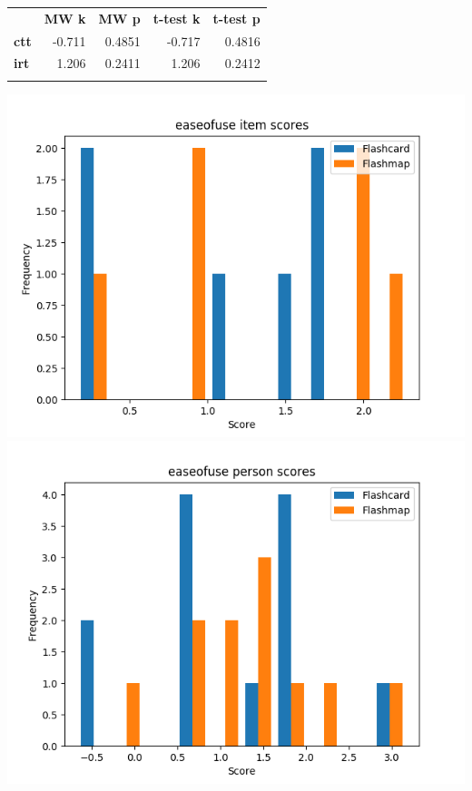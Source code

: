 \begin{longtable}[c]{@{}lrrrr@{}}
\toprule\addlinespace
& \textbf{MW k} & \textbf{MW p} &
\textbf{t-test k} & \textbf{t-test p}
\\\addlinespace
\midrule
\textbf{ctt} & -0.711 & 0.4851 & -0.717 & 0.4816
\\\addlinespace
\textbf{irt} & 1.206 & 0.2411 & 1.206 & 0.2412
\\\addlinespace
\bottomrule
\end{longtable}

\includegraphics[width=\textwidth]{img/easeofuse_diff.png}
\includegraphics[width=\textwidth]{img/easeofuse_abil.png}
